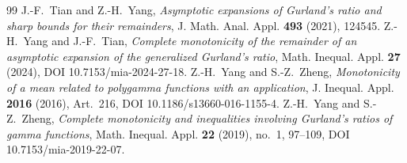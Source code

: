 \begin{thebibliography}{99}
 J.-F.~Tian and Z.-H.~Yang, \emph{Asymptotic expansions of Gurland's
ratio and sharp bounds for their remainders}, J. Math. Anal. Appl. \textbf{493} (2021),
124545.
 Z.-H.~Yang and J.-F.~Tian, \emph{Complete monotonicity of the remainder
of an asymptotic expansion of the generalized Gurland's ratio}, Math. Inequal. Appl.
\textbf{27} (2024), DOI 10.7153/mia-2024-27-18.
 Z.-H.~Yang and S.-Z.~Zheng, \emph{Monotonicity of a mean related to
polygamma functions with an application}, J. Inequal. Appl. \textbf{2016} (2016),
Art.~216, DOI 10.1186/s13660-016-1155-4.
 Z.-H.~Yang and S.-Z.~Zheng, \emph{Complete monotonicity and
inequalities involving Gurland's ratios of gamma functions}, Math. Inequal. Appl.
\textbf{22} (2019), no.~1, 97--109, DOI 10.7153/mia-2019-22-07.
\end{thebibliography}


